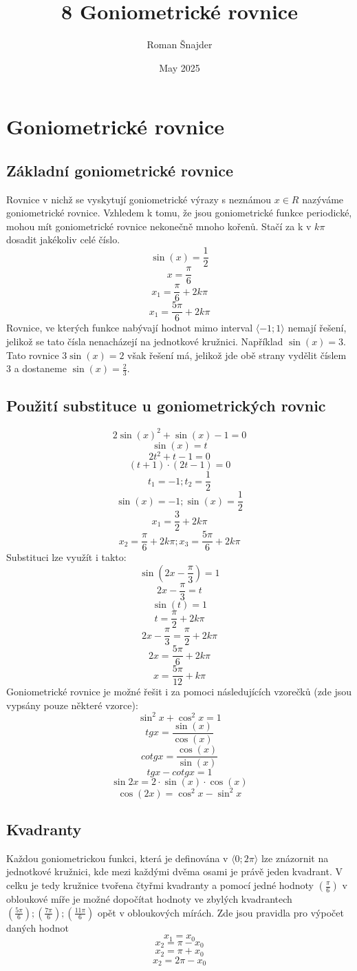 \title{8 Goniometrické rovnice}
\author{Roman Šnajder}
\date{May 2025}


\maketitle

\section{Goniometrické rovnice}
\subsection{Základní goniometrické rovnice}
Rovnice v nichž se vyskytují goniometrické výrazy s neznámou $x\in R$ nazýváme goniometrické rovnice. Vzhledem k tomu, že jsou goniometrické funkce periodické, mohou mít goniometrické rovnice nekonečně mnoho kořenů. Stačí za k v $k\pi$ dosadit jakékoliv celé číslo.
$$\sin(x)=\frac{1}{2}$$
$$x=\frac{\pi}{6}$$
$$x_1=\frac{\pi}{6}+2k\pi$$
$$x_1=\frac{5\pi}{6}+2k\pi$$
Rovnice, ve kterých funkce nabývají hodnot mimo interval $\langle -1; 1 \rangle$ nemají řešení, jelikož se tato čísla nenacházejí na jednotkové kružnici. Například $\sin(x)=3$.
Tato rovnice $3\sin(x)=2$ však řešení má, jelikož jde obě strany vydělit číslem $3$ a dostaneme $\sin(x)=\frac{2}{3}$.
\subsection{Použití substituce u goniometrických rovnic}
$$2\sin(x)^2+\sin(x)-1=0$$ $$\sin(x)=t$$
$$2t^2+t-1=0$$
$$(t+1)\cdot(2t-1)=0$$
$$t_1=-1; t_2=\frac{1}{2}$$
$$\sin(x)=-1;\sin(x)=\frac{1}{2}$$
$$x_1=\frac{3}{2}+2k\pi$$
$$x_2=\frac{\pi}{6}+2k\pi;x_3=\frac{5\pi}{6}+2k\pi$$
Substituci lze využít i takto:
$$\sin(2x-\frac{\pi}{3})=1$$
$$2x-\frac{\pi}{3}=t$$
$$\sin(t)=1$$
$$t=\frac{\pi}{2}+2k\pi$$ 
$$2x-\frac{\pi}{3}=\frac{\pi}{2}+2k\pi$$
$$2x=\frac{5\pi}{6}+2k\pi$$
$$x=\frac{5\pi}{12}+k\pi$$
Goniometrické rovnice je možné řešit i za pomoci následujících vzorečků (zde jsou vypsány pouze některé vzorce):
$$\sin^2x+\cos^2x=1$$
$$tgx=\frac{\sin(x)}{\cos(x)}$$
$$cotgx=\frac{\cos(x)}{\sin(x)}$$
$$tgx-cotgx=1$$
$$\sin2x=2\cdot \sin(x)\cdot \cos(x)$$
$$\cos(2x)=\cos^2x-\sin^2x$$
\subsection{Kvadranty}
Každou goniometrickou funkci, která je definována v $\langle0; 2\pi\rangle$ lze znázornit na jednotkové kružnici, kde mezi každými dvěma osami je právě jeden kvadrant. V celku je tedy kružnice tvořena čtyřmi kvadranty a pomocí jedné hodnoty $(\frac{\pi}{6})$ v obloukové míře je možné dopočítat hodnoty ve zbylých kvadrantech $(\frac{5\pi}{6}); (\frac{7\pi}{6}); (\frac{11\pi}{6})$ opět v obloukových mírách.
Zde jsou pravidla pro výpočet daných hodnot $$x_1=x_0$$ $$x_2=\pi-x_0$$ $$x_2=\pi+x_0$$ $$x_2=2\pi-x_0$$
